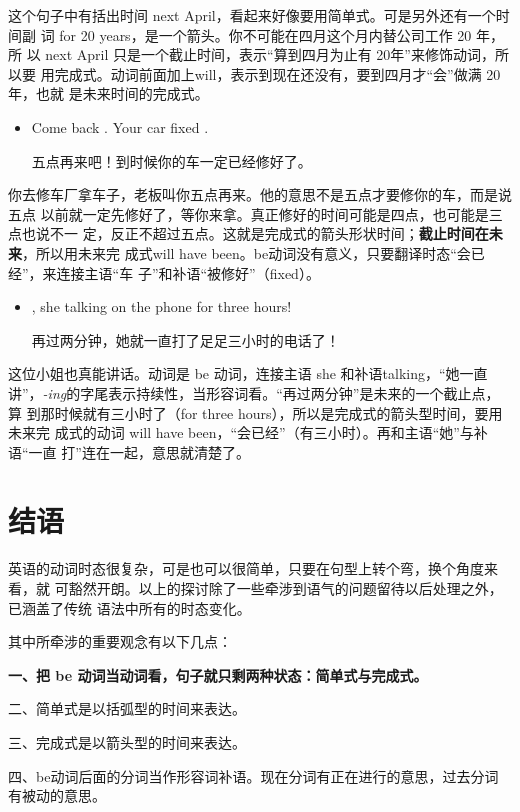 这个句子中有括出时间 next April，看起来好像要用简单式。可是另外还有一个时间副
词 for 20 years，是一个箭头。你不可能在四月这个月内替公司工作 20 年，所
以 next April 只是一个截止时间，表示“算到四月为止有 20年”来修饰动词，所以要
用完成式。动词前面加上will，表示到现在还没有，要到四月才“会”做满 20年，也就
是未来时间的完成式。

\begin{itemize}
\item  Come back . Your car  fixed .

  五点再来吧！到时候你的车一定已经修好了。
\end{itemize}

你去修车厂拿车子，老板叫你五点再来。他的意思不是五点才要修你的车，而是说五点
以前就一定先修好了，等你来拿。真正修好的时间可能是四点，也可能是三点也说不一
定，反正不超过五点。这就是完成式的箭头形状时间；\textbf{截止时间在未来}，所以用未来完
成式will have been。be动词没有意义，只要翻译时态“会已经”，来连接主语“车
子”和补语“被修好”（fixed）。

\begin{itemize}
\item {}, she  talking on the phone for
  three hours!

  再过两分钟，她就一直打了足足三小时的电话了！
\end{itemize}

这位小姐也真能讲话。动词是 be 动词，连接主语 she 和补语talking，“她一直
讲”，\emph{-ing}的字尾表示持续性，当形容词看。“再过两分钟”是未来的一个截止点，算
到那时候就有三小时了（for three hours），所以是完成式的箭头型时间，要用未来完
成式的动词 will have been，“会已经”（有三小时）。再和主语“她”与补语“一直
打”连在一起，意思就清楚了。

\section{结语}

英语的动词时态很复杂，可是也可以很简单，只要在句型上转个弯，换个角度来看，就
可豁然开朗。以上的探讨除了一些牵涉到语气的问题留待以后处理之外，已涵盖了传统
语法中所有的时态变化。

其中所牵涉的重要观念有以下几点：

{\bfseries 一、把 be 动词当动词看，句子就只剩两种状态：简单式与完成式。

  二、简单式是以括弧型的时间来表达。

  三、完成式是以箭头型的时间来表达。

  四、be动词后面的分词当作形容词补语。现在分词有正在进行的意思，过去分词有被动的意思。}


